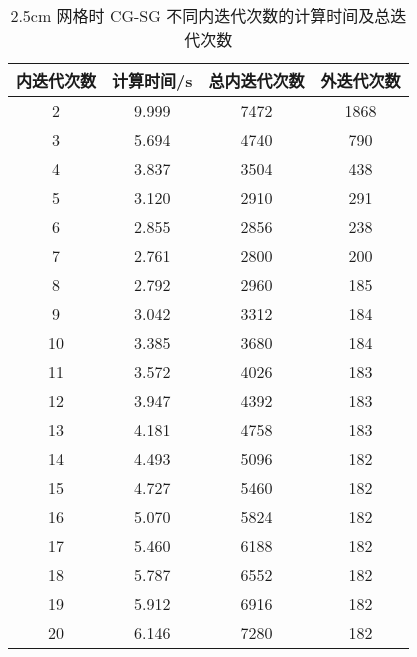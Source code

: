 \begin{datasheet}
\begin{table}
\centering
\caption{2.5cm 网格时 CG-SG 不同内迭代次数的计算时间及总迭代次数}
\label{tab:equsolve.iter.cg-sg.2.5cm}
\begin{tabular}{cccc}
\toprule
内迭代次数 & 计算时间/s & 总内迭代次数 & 外迭代次数\\
\midrule
2 & 9.999 & 7472 & 1868\\
3 & 5.694 & 4740 & 790\\
4 & 3.837 & 3504 & 438\\
5 & 3.120 & 2910 & 291\\
6 & 2.855 & 2856 & 238\\
7 & 2.761 & 2800 & 200\\
8 & 2.792 & 2960 & 185\\
9 & 3.042 & 3312 & 184\\
10 & 3.385 & 3680 & 184\\
11 & 3.572 & 4026 & 183\\
12 & 3.947 & 4392 & 183\\
13 & 4.181 & 4758 & 183\\
14 & 4.493 & 5096 & 182\\
15 & 4.727 & 5460 & 182\\
16 & 5.070 & 5824 & 182\\
17 & 5.460 & 6188 & 182\\
18 & 5.787 & 6552 & 182\\
19 & 5.912 & 6916 & 182\\
20 & 6.146 & 7280 & 182\\
\bottomrule
\end{tabular}
\end{table}


\end{datasheet}
